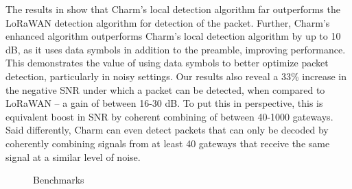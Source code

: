 The results in  show that Charm's local detection
algorithm far outperforms the LoRaWAN detection algorithm for detection of the
packet. Further, Charm's enhanced algorithm outperforms Charm's local
detection algorithm by up to 10 dB, as it uses data symbols in addition to the
preamble, improving performance. This demonstrates the value of using data
symbols to better optimize packet detection, particularly in noisy settings.
Our results also reveal a 33\% increase in the negative SNR under which a
packet can be detected, when compared to LoRaWAN -- a gain of between 16-30
dB. To put this in perspective, this is equivalent boost in SNR by coherent
combining of between 40-1000 gateways. Said differently, Charm can even detect
packets that can only be decoded by coherently combining signals from at least
40 gateways that receive the same signal at a similar level of noise.

\begin{figure}[!t]
\centering
{}
\hfill
{}
\hfill
{}
\compactimg
\caption{Benchmarks}
\label{fig:results}
\compactimg
\end{figure}

